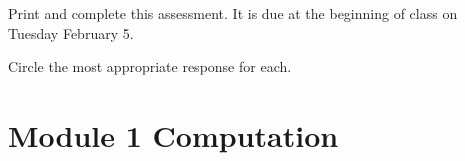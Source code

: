 \documentclass[13pt]{exam}
\begin{document}
\begin{center}
\end{center}
\vspace{0.1in}

\vspace{12pt}

Print and complete this assessment. It is due at the beginning of class on
Tuesday February 5.

\vspace{1em}

Circle the most appropriate response for each.

\section*{Module 1 Computation}
\end{document}
